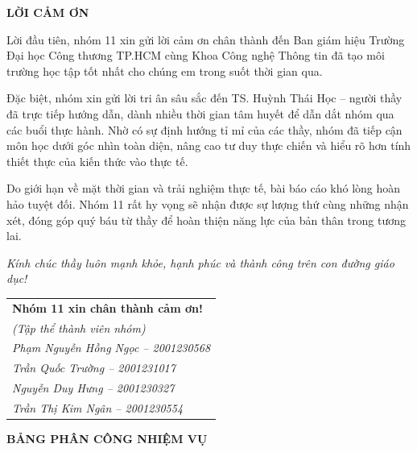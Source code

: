 \documentclass[a4paper,12pt]{article}
\begin{document}
\newpage
{}
\begin{center}
    {\fontsize{16pt}{20pt}\selectfont \textbf{LỜI CẢM ƠN}}
\end{center}

\vspace{1cm}

\setlength{\parindent}{1cm} 
\fontsize{13pt}{18pt}\selectfont 

Lời đầu tiên, nhóm 11 xin gửi lời cảm ơn chân thành đến Ban giám hiệu Trường Đại học Công thương TP.HCM cùng Khoa Công nghệ Thông tin đã tạo môi trường học tập tốt nhất cho chúng em trong suốt thời gian qua.

Đặc biệt, nhóm xin gửi lời tri ân sâu sắc đến TS. Huỳnh Thái Học -- người thầy đã trực tiếp hướng dẫn, dành nhiều thời gian tâm huyết để dẫn dắt nhóm qua các buổi thực hành. Nhờ có sự định hướng tỉ mỉ của các thầy, nhóm đã tiếp cận môn học dưới góc nhìn toàn diện, nâng cao tư duy thực chiến và hiểu rõ hơn tính thiết thực của kiến thức vào thực tế.

Do giới hạn về mặt thời gian và trải nghiệm thực tế, bài báo cáo khó lòng hoàn hảo tuyệt đối. Nhóm 11 rất hy vọng sẽ nhận được sự lượng thứ cùng những nhận xét, đóng góp quý báu từ thầy để hoàn thiện năng lực của bản thân trong tương lai.

\textit{Kính chúc thầy luôn mạnh khỏe, hạnh phúc và thành công trên con đường giáo dục!}

\vspace{1.5cm}

\begin{flushright}
\begin{tabular}{l} 
    \textbf{Nhóm 11 xin chân thành cảm ơn!} \\
    \textit{(Tập thể thành viên nhóm)} \\[0.5em]
    \textit{Phạm Nguyễn Hồng Ngọc -- 2001230568} \\
    \textit{Trần Quốc Trường -- 2001231017} \\
    \textit{Nguyễn Duy Hưng -- 2001230327}\\
    \textit{Trần Thị Kim Ngân -- 2001230554} 
\end{tabular}
\hspace{1cm} 
\end{flushright}

\newpage
{}
\begin{center}
    {\fontsize{16pt}{20pt}\selectfont \textbf{BẢNG PHÂN CÔNG NHIỆM VỤ}}
\end{center}
\end{document}

